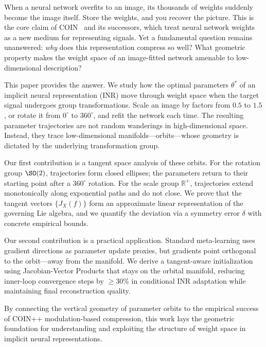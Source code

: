 When a neural network overfits to an image, its thousands of weights suddenly become the image itself.
Store the weights, and you recover the picture.
This is the core claim of COIN~\citep{chen2022coin} and its successors, which treat neural network weights as a new medium for representing signals.
Yet a fundamental question remains unanswered: \emph{why} does this representation compress so well?
What geometric property makes the weight space of an image-fitted network amenable to low-dimensional description?

This paper provides the answer.
We study how the optimal parameters $\theta^*$ of an implicit neural representation (INR) move through weight space when the target signal undergoes group transformations.
Scale an image by factors from $0.5$ to $1.5$, or rotate it from $0^\circ$ to $360^\circ$, and refit the network each time.
The resulting parameter trajectories are not random wanderings in high-dimensional space.
Instead, they trace low-dimensional manifolds---orbits---whose geometry is dictated by the underlying transformation group.

Our first contribution is a tangent space analysis of these orbits.
For the rotation group $\SO(2)$, trajectories form closed ellipses; the parameters return to their starting point after a $360^\circ$ rotation.
For the scale group $\mathbb{R}^+$, trajectories extend monotonically along exponential paths and do not close.
We prove that the tangent vectors $\{J_X(f)\}$ form an approximate linear representation of the governing Lie algebra, and we quantify the deviation via a symmetry error $\delta$ with concrete empirical bounds.

Our second contribution is a practical application.
Standard meta-learning uses gradient directions as parameter update proxies, but gradients point orthogonal to the orbit---away from the manifold.
We derive a tangent-aware initialization using Jacobian-Vector Products that stays on the orbital manifold, reducing inner-loop convergence steps by $\ge 30\%$ in conditional INR adaptation while maintaining final reconstruction quality.

By connecting the vertical geometry of parameter orbits to the empirical success of COIN++ modulation-based compression, this work lays the geometric foundation for understanding and exploiting the structure of weight space in implicit neural representations.
